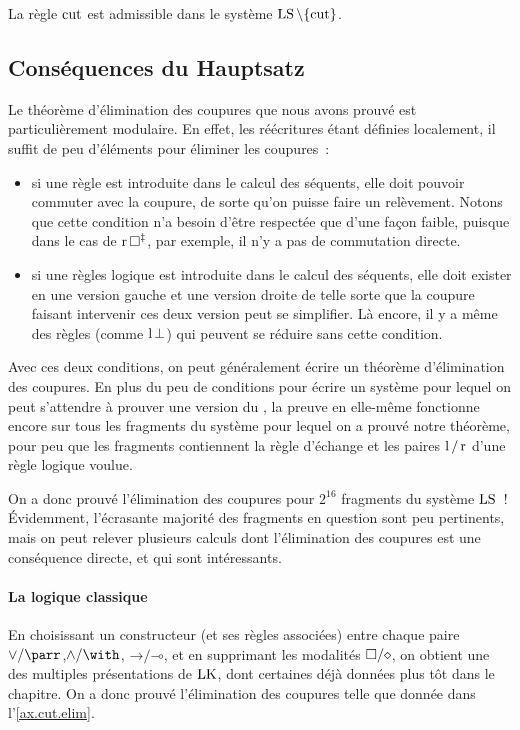 \begin{corollary}
  La règle $\operatorname{cut}$ est admissible dans le système $\operatorname{LS} \setminus\{\operatorname{cut}\}$.
\end{corollary}

\subsection{Conséquences du Hauptsatz}

Le théorème d'élimination des coupures que nous avons prouvé est
particulièrement modulaire. En effet, les réécritures étant définies localement,
il suffit de peu d'éléments pour éliminer les coupures~:
\begin{itemize}
\item si une règle est introduite dans le calcul des séquents, elle doit
  pouvoir commuter avec la coupure, de sorte qu'on puisse faire un relèvement.
  Notons que cette condition n'a besoin d'être respectée que d'une façon
  faible, puisque dans le cas de $\operatorname{r}\mathord{\mathbin{\square}}^\ddagger$, par exemple, il n'y a pas
  de commutation directe.
\item si une règles logique est introduite dans le calcul des séquents, elle
  doit exister en une version gauche et une version droite de telle sorte que
  la coupure faisant intervenir ces deux version peut se simplifier. Là encore,
  il y a même des règles (comme $\operatorname{l}\mathord{\bot}$) qui peuvent se réduire sans cette
  condition.
\end{itemize}
Avec ces deux conditions, on peut généralement écrire un théorème d'élimination
des coupures. En plus du peu de conditions pour écrire un système pour lequel on
peut s'attendre à prouver une version du , la preuve
en elle-même fonctionne encore sur tous les fragments du système pour lequel on
a prouvé notre théorème, pour peu que les fragments contiennent la règle
d'échange et les paires $\operatorname{l}/\operatorname{r}$ d'une règle logique voulue.

On a donc prouvé l'élimination des coupures pour $2^{16}$ fragments du système
$\operatorname{LS}$~! \'Evidemment, l'écrasante majorité des fragments en question sont peu
pertinents, mais on peut relever plusieurs calculs dont l'élimination des
coupures est une conséquence directe, et qui sont intéressants.

\paragraph{La logique classique}
En choisissant un constructeur (et ses règles associées) entre chaque paire
$\mathord{\lor}/\mathord{\parr}$,$\mathord{\land}/\mathord{\with}$,
$\mathord{\to}/\mathord{\multimap}$, et en supprimant les modalités
$\mathord{\mathbin{\square}}/\mathord{\mathbin{\diamond}}$, on obtient une des multiples présentations
de $\operatorname{LK}$, dont certaines déjà données plus tôt dans le chapitre. On a donc
prouvé l'élimination des coupures telle que donnée dans l'\cref{ax.cut.elim}.

